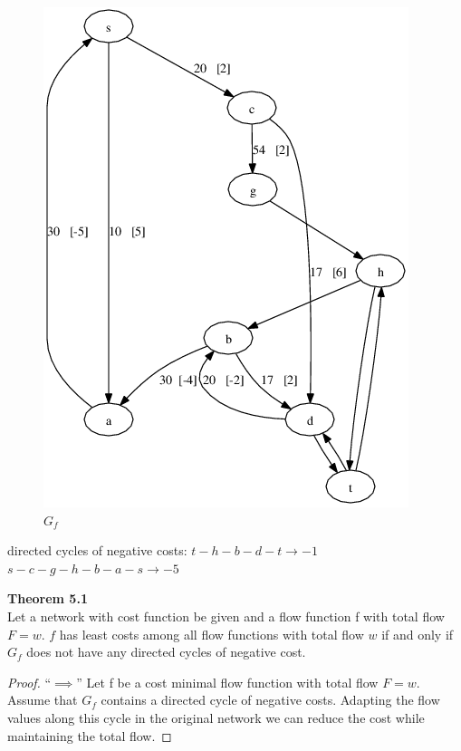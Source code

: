 \begin{example}
\begin{figure}[h]
\includegraphics[scale=0.45]{diagrams/graph5_9}
\caption{$G{_f}$}
\label{fig:G11}
\end{figure}

directed cycles of negative costs:
$t - h - b - d - t \rightarrow -1$\\
$s - c - g - h- b - a - s \rightarrow -5$\\
\end{example}


\textbf{Theorem 5.1}\\
Let a network with cost function be given and a flow function f with total flow $F=w$. $f$ has least costs among all flow functions with total flow $w$ if and only if $G{_f}$ does not have any directed cycles of negative cost.

\begin{proof}
``$\implies$'' Let f be a cost minimal flow function with total flow $F=w$. Assume that $G{_f}$ contains a directed cycle of negative costs. Adapting the flow values along this cycle in the original network we can reduce the cost while maintaining the total flow.
\end{proof}

